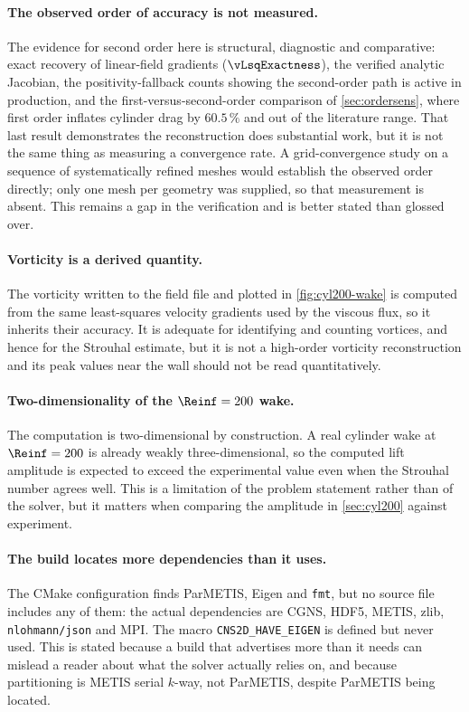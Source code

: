 \paragraph{The observed order of accuracy is not measured.} The evidence for
second order here is structural, diagnostic and comparative: exact recovery of
linear-field gradients ($\vLsqExactness$), the verified analytic Jacobian, the
positivity-fallback counts showing the second-order path is active in production,
and the first-versus-second-order comparison of \cref{sec:ordersens}, where first
order inflates cylinder drag by $60.5\,\%$ and out of the literature range. That
last result demonstrates the reconstruction does substantial work, but it is not
the same thing as measuring a convergence rate. A grid-convergence study on a
sequence of systematically refined meshes would establish the observed order
directly; only one mesh per geometry was supplied, so that measurement is absent.
This remains a gap in the verification and is better stated than glossed over.

\paragraph{Vorticity is a derived quantity.} The vorticity written to the field
file and plotted in \cref{fig:cyl200-wake} is computed from the same
least-squares velocity gradients used by the viscous flux, so it inherits their
accuracy. It is adequate for identifying and counting vortices, and hence for the
Strouhal estimate, but it is not a high-order vorticity reconstruction and its
peak values near the wall should not be read quantitatively.

\paragraph{Two-dimensionality of the $\Reinf=200$ wake.} The computation is
two-dimensional by construction. A real cylinder wake at $\Reinf=200$ is already
weakly three-dimensional, so the computed lift amplitude is expected to exceed the
experimental value even when the Strouhal number agrees well. This is a limitation
of the problem statement rather than of the solver, but it matters when comparing
the amplitude in \cref{sec:cyl200} against experiment.

\paragraph{The build locates more dependencies than it uses.} The CMake
configuration finds ParMETIS, Eigen and \texttt{fmt}, but no source file includes
any of them: the actual dependencies are CGNS, HDF5, METIS, zlib,
\texttt{nlohmann/json} and MPI. The macro \texttt{CNS2D\_HAVE\_EIGEN} is defined
but never used. This is stated because a build that advertises more than it needs
can mislead a reader about what the solver actually relies on, and because
partitioning is METIS serial $k$-way, not ParMETIS, despite ParMETIS being located.

